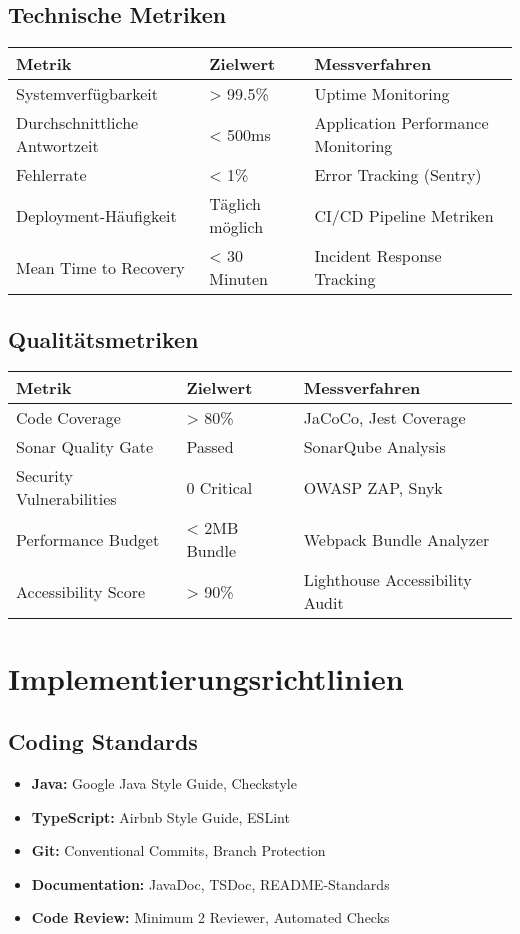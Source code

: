\documentclass[a4paper,12pt]{article}
\begin{document}
\subsection{Technische Metriken}
\begin{longtable}{|p{}|p{}|p{}|}
\hline
\textbf{Metrik} & \textbf{Zielwert} & \textbf{Messverfahren} \\
\hline
Systemverfügbarkeit & > 99.5\% & Uptime Monitoring \\
\hline
Durchschnittliche Antwortzeit & < 500ms & Application Performance Monitoring \\
\hline
Fehlerrate & < 1\% & Error Tracking (Sentry) \\
\hline
Deployment-Häufigkeit & Täglich möglich & CI/CD Pipeline Metriken \\
\hline
Mean Time to Recovery & < 30 Minuten & Incident Response Tracking \\
\hline
\end{longtable}

\subsection{Qualitätsmetriken}
\begin{longtable}{|p{}|p{}|p{}|}
\hline
\textbf{Metrik} & \textbf{Zielwert} & \textbf{Messverfahren} \\
\hline
Code Coverage & > 80\% & JaCoCo, Jest Coverage \\
\hline
Sonar Quality Gate & Passed & SonarQube Analysis \\
\hline
Security Vulnerabilities & 0 Critical & OWASP ZAP, Snyk \\
\hline
Performance Budget & < 2MB Bundle & Webpack Bundle Analyzer \\
\hline
Accessibility Score & > 90\% & Lighthouse Accessibility Audit \\
\hline
\end{longtable}

\section{Implementierungsrichtlinien}

\subsection{Coding Standards}
\begin{itemize}
    \item \textbf{Java:} Google Java Style Guide, Checkstyle
    \item \textbf{TypeScript:} Airbnb Style Guide, ESLint
    \item \textbf{Git:} Conventional Commits, Branch Protection
    \item \textbf{Documentation:} JavaDoc, TSDoc, README-Standards
    \item \textbf{Code Review:} Minimum 2 Reviewer, Automated Checks
\end{itemize}
\end{document}
